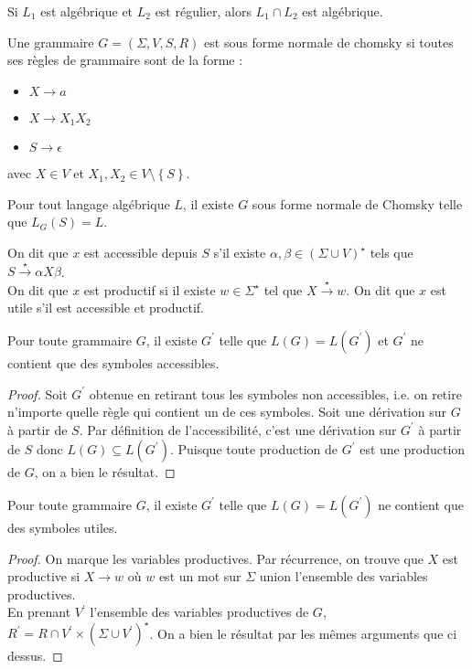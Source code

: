 \documentclass{cours}
\begin{document}
\begin{theorem}\label{thm:capalgreg}
    Si $L_{1}$ est algébrique et $L_{2}$ est régulier, alors $L_{1} \cap L_{2}$ est algébrique.
\end{theorem}

\begin{definition}\label{thm:fnc}
    Une grammaire $G = \left(\Sigma, V, S, R\right)$ est sous forme normale de chomsky si toutes ses règles de grammaire sont de la forme : 
    \begin{itemize}
        \item $X \rightarrow a$
        \item $X \rightarrow X_{1}X_{2}$
        \item $S \rightarrow \epsilon$
    \end{itemize}
    avec $X \in V$ et $X_{1}, X_{2} \in V \setminus \left\{S\right\}$.
\end{definition}
\begin{theorem}
    Pour tout langage algébrique $L$, il existe $G$ sous forme normale de Chomsky telle que $L_{G}(S) = L$.
\end{theorem}
\begin{definition}
    On dit que $x$ est accessible depuis $S$ s'il existe $\alpha, \beta \in \left(\Sigma \cup V\right)^{\star}$ tels que $S \xrightarrow{\star} \alpha X \beta$.\\
    On dit que $x$ est productif si il existe $w \in \Sigma^{\star}$ tel que $X \xrightarrow{\star} w$.
    On dit que $x$ est utile s'il est accessible et productif.
\end{definition}

\begin{lemma}\label{lemme1chomskygrammar}
    Pour toute grammaire $G$, il existe $G^{'}$ telle que $L(G) = L(G^{'})$ et $G^{'}$ ne contient que des symboles accessibles.
\end{lemma}
\begin{proof}
    Soit $G^{'}$ obtenue en retirant tous les symboles non accessibles, i.e. on retire n'importe quelle règle qui contient un de ces symboles. Soit une dérivation sur $G$ à partir de $S$. Par définition de l'accessibilité, c'est une dérivation sur $G^{'}$ à partir de $S$ donc $L(G) \subseteq L(G^{'})$. Puisque toute production de $G^{'}$ est une production de $G$, on a bien le résultat.
\end{proof}

\begin{lemma}\label{lemme2chomskygrammar}
    Pour toute grammaire $G$, il existe $G^{'}$ telle que $L(G) = L(G^{'})$ ne contient que des symboles utiles.
\end{lemma}
\begin{proof}
    On marque les variables productives. Par récurrence, on trouve que $X$ est productive si $X \rightarrow w$ où $w$ est un mot sur $\Sigma$ union l'ensemble des variables productives.\\
    En prenant $V^{'}$ l'ensemble des variables productives de $G$, $R^{'} = R \cap V^{'} \times \left(\Sigma \cup V^{'}\right)^{\star}$. On a bien le résultat par les mêmes arguments que ci dessus.
\end{proof}
\end{document}
